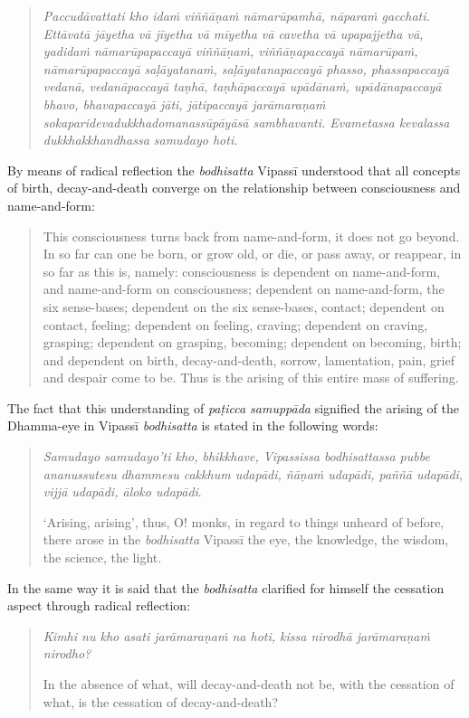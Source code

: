 \begin{quote}
\emph{Paccudāvattati kho idaṁ viññāṇaṁ nāmarūpamhā, nāparaṁ gacchati. Ettāvatā jāyetha vā jīyetha vā mīyetha vā cavetha vā upapajjetha vā, yadidaṁ nāmarūpapaccayā viññāṇaṁ, viññāṇapaccayā nāmarūpaṁ, nāmarūpapaccayā saḷāyatanaṁ, saḷāyatanapaccayā phasso, phassapaccayā vedanā, vedanāpaccayā taṇhā, taṇhāpaccayā upādānaṁ, upādānapaccayā bhavo, bhavapaccayā jāti, jātipaccayā jarāmaraṇaṁ sokaparidevadukkhadomanassūpāyāsā sambhavanti. Evametassa kevalassa dukkhakkhandhassa samudayo hoti.}
\end{quote}

By means of radical reflection the \emph{bodhisatta} Vipassī understood that all concepts of birth, decay-and-death converge on the relationship between consciousness and name-and-form:

\begin{quote}
This consciousness turns back from name-and-form, it does not go beyond. In so far can one be born, or grow old, or die, or pass away, or reappear, in so far as this is, namely: consciousness is dependent on name-and-form, and name-and-form on consciousness; dependent on name-and-form, the six sense-bases; dependent on the six sense-bases, contact; dependent on contact, feeling; dependent on feeling, craving; dependent on craving, grasping; dependent on grasping, becoming; dependent on becoming, birth; and dependent on birth, decay-and-death, sorrow, lamentation, pain, grief and despair come to be. Thus is the arising of this entire mass of suffering.
\end{quote}

The fact that this understanding of \emph{paṭicca samuppāda} signified the arising of the Dhamma-eye in Vipassī \emph{bodhisatta} is stated in the following words:

\begin{quote}
\emph{Samudayo samudayo'ti kho, bhikkhave, Vipassissa bodhisattassa pubbe ananussutesu dhammesu cakkhum udapādi, ñāṇaṁ udapādi, paññā udapādi, vijjā udapādi, āloko udapādi}.

`Arising, arising', thus, O! monks, in regard to things unheard of before, there arose in the \emph{bodhisatta} Vipassī the eye, the knowledge, the wisdom, the science, the light.
\end{quote}

In the same way it is said that the \emph{bodhisatta} clarified for himself the cessation aspect through radical reflection:

\begin{quote}
\emph{Kimhi nu kho asati jarāmaraṇaṁ na hoti, kissa nirodhā jarāmaraṇaṁ nirodho?}

In the absence of what, will decay-and-death not be, with the cessation of what, is the cessation of decay-and-death?
\end{quote}

